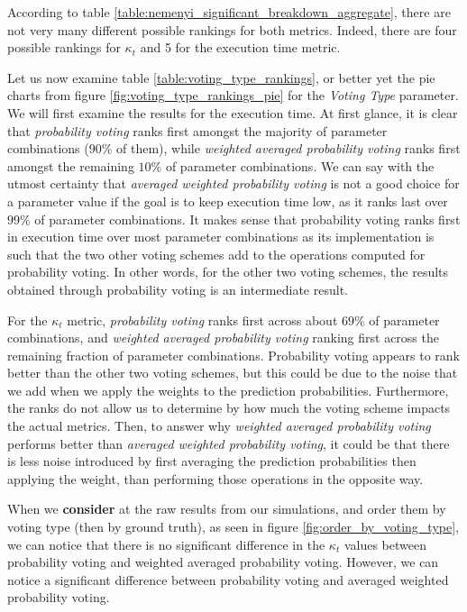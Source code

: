 According to table \ref{table:nemenyi_significant_breakdown_aggregate}, there are not very many different possible rankings for both metrics. Indeed, there are four possible rankings for $\kappa_t$ and 5 for the execution time metric.

Let us now examine table \ref{table:voting_type_rankings}, or better yet the pie charts from figure \ref{fig:voting_type_rankings_pie} for the \textit{Voting Type} parameter.
We will first examine the results for the execution time. At first glance, it is clear that \textit{probability voting} ranks first amongst the majority of parameter combinations ($90\%$ of them), while \textit{weighted averaged probability voting} ranks first amongst the remaining $10\%$ of parameter combinations. We can say with the utmost certainty that \textit{averaged weighted probability voting} is not a good choice for a parameter value if the goal is to keep execution time low, as it ranks last over $99\%$ of parameter combinations. It makes sense that probability voting ranks first in execution time over most parameter combinations as its implementation is such that the two other voting schemes add to the operations computed for probability voting. In other words, for the other two voting schemes, the results obtained through probability voting is an intermediate result.

For the $\kappa_t$ metric, \textit{probability voting} ranks first across about $69\%$ of parameter combinations, and \textit{weighted averaged probability voting} ranking first across the remaining fraction of parameter combinations. Probability voting appears to rank better than the other two voting schemes, but this could be due to the noise that we add when we apply the weights to the prediction probabilities. Furthermore, the ranks do not allow us to determine by how much the voting scheme impacts the actual metrics. Then, to answer why \textit{weighted averaged probability voting} performs better than \textit{averaged weighted probability voting}, it could be that there is less noise introduced by first averaging the prediction probabilities then applying the weight, than performing those operations in the opposite way.

When we \textbf{consider} at the raw results from our simulations, and order them by voting type (then by ground truth), as seen in figure \ref{fig:order_by_voting_type}, we can notice that there is no significant difference in the $\kappa_t$ values between probability voting and weighted averaged probability voting. However, we can notice a significant difference between probability voting and averaged weighted probability voting.

